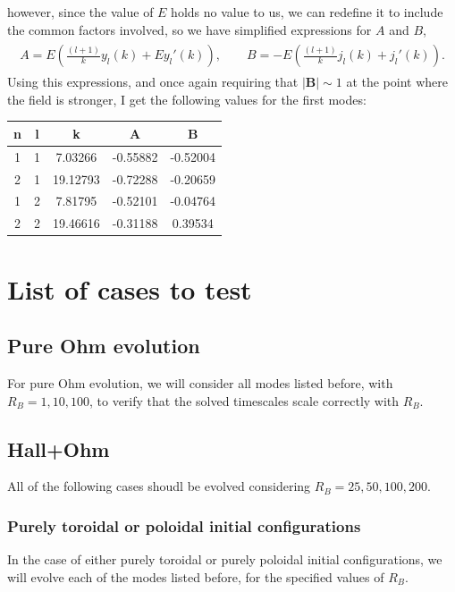 \documentclass[letterpaper,10pt]{article}
\renewcommand{\vec}[1]{\boldsymbol#1}
\begin{document}
however, since the value of $E$ holds no value to us, we can redefine it to include the common factors involved, so we have simplified expressions for $A$ and $B$,
\begin{eqnarray}
\begin{aligned}
A=E\left(\frac{(l+1)}{k}y_l(k)+Ey_l'(k)\right),\qquad
B=-E\left(\frac{(l+1)}{k}j_l(k)+j_l'(k)\right).
\end{aligned}
\end{eqnarray}
Using this expressions, and once again requiring that $|\vec{B}|\sim 1$ at the point where the field is stronger, I get the following values for the first modes:
\begin{table}[h!]
\begin{center}
\begin{tabular}{cc|ccc}
n&l&k&A&B\\
\hline
1&1&  7.03266 & -0.55882 & -0.52004\\
2&1& 19.12793 & -0.72288 & -0.20659\\
1&2&  7.81795 & -0.52101 & -0.04764\\
2&2& 19.46616 & -0.31188 &  0.39534
\end{tabular}
\end{center}
\end{table}

\section*{List of cases to test}
\subsection*{Pure Ohm evolution}
For pure Ohm evolution, we will consider all modes listed before, with $R_B=1,10,100$, to verify that the solved timescales scale correctly with $R_B$.
\subsection*{Hall+Ohm}
All of the following cases shoudl be evolved considering $R_B=25,50,100,200$.
\subsubsection*{Purely toroidal or poloidal initial configurations}
In the case of either purely toroidal or purely poloidal initial configurations, we will evolve each of the modes listed before, for the specified values of $R_B$.
\end{document}
